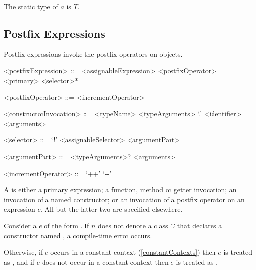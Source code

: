 \documentclass[makeidx]{article}
\begin{document}
{


\LMHash{}%
The static type of $a$ is $T$.


\subsection{Postfix Expressions}

\LMHash{}%
Postfix expressions invoke the postfix operators on objects.

\begin{grammar}
<postfixExpression> ::= <assignableExpression> <postfixOperator>
  \alt <primary> <selector>*

<postfixOperator> ::= <incrementOperator>

<constructorInvocation> ::= \gnewline{}
  <typeName> <typeArguments> `.' <identifier> <arguments>

<selector> ::= `!'
  \alt <assignableSelector>
  \alt <argumentPart>

<argumentPart> ::=
  <typeArguments>? <arguments>

<incrementOperator> ::= `++'
  \alt `-\mbox-'
\end{grammar}

\LMHash{}%
A  is either a primary expression;
a function, method or getter invocation;
an invocation of a named constructor;
or an invocation of a postfix operator on an expression $e$.
All but the latter two are specified elsewhere.

\LMHash{}%
Consider a  $e$ of the form
.
If $n$ does not denote a class $C$
that declares a constructor named ,
a compile-time error occurs.

\LMHash{}%
Otherwise, if $e$ occurs in a constant context
(\ref{constantContexts})
then $e$ is treated as ,
and if $e$ does not occur in a constant context
then $e$ is treated as .

\EndCase

}
\end{document}
